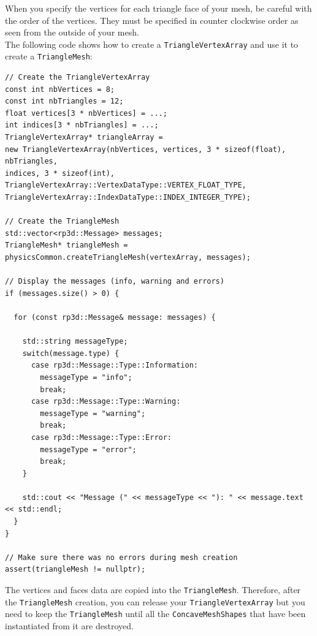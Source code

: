 \documentclass[a4paper,12pt]{article}
\begin{document}
  When you specify the vertices for each triangle face of your mesh, be careful with the order of the vertices. They must be specified in counter
  clockwise order as seen from the outside of your mesh. \\

  The following code shows how to create a \texttt{TriangleVertexArray} and use it to create a \texttt{TriangleMesh}: \\

  \begin{lstlisting}
// Create the TriangleVertexArray
const int nbVertices = 8;
const int nbTriangles = 12;
float vertices[3 * nbVertices] = ...;
int indices[3 * nbTriangles] = ...;
TriangleVertexArray* triangleArray =
new TriangleVertexArray(nbVertices, vertices, 3 * sizeof(float), nbTriangles,
indices, 3 * sizeof(int),
TriangleVertexArray::VertexDataType::VERTEX_FLOAT_TYPE,
TriangleVertexArray::IndexDataType::INDEX_INTEGER_TYPE);

// Create the TriangleMesh
std::vector<rp3d::Message> messages;
TriangleMesh* triangleMesh = physicsCommon.createTriangleMesh(vertexArray, messages);

// Display the messages (info, warning and errors)
if (messages.size() > 0) {

  for (const rp3d::Message& message: messages) {

    std::string messageType;
    switch(message.type) {
      case rp3d::Message::Type::Information:
        messageType = "info";
        break;
      case rp3d::Message::Type::Warning:
        messageType = "warning";
        break;
      case rp3d::Message::Type::Error:
        messageType = "error";
        break;
    }

    std::cout << "Message (" << messageType << "): " << message.text << std::endl;
  }
}

// Make sure there was no errors during mesh creation
assert(triangleMesh != nullptr);
  \end{lstlisting}

  \vspace{0.6cm}

  The vertices and faces data are copied into the \texttt{TriangleMesh}. Therefore, after the \texttt{TriangleMesh} creation, you can release your
  \texttt{TriangleVertexArray} but you need to keep the \texttt{TriangleMesh} until all the \texttt{ConcaveMeshShapes} that have been instantiated from
  it are destroyed. \\
\end{document}
